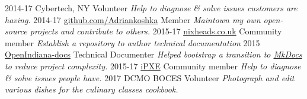 \documentclass[]{friggeri-cv}
\begin{document}
\begin{entrylist}
  \entry
    {2014-17}
    {Cybertech, NY}
    {Volunteer}
    {\emph{Help to diagnose \& solve issues customers are having.}}
  \entry
    {2014-17}
    {\href{https://github.com/AdrianKoshka/}{github.com/Adriankoshka}}
    {Member}
    {\emph{Maintown my own open-source projects and contribute to others.}}
  \entry
    {2015-17}
    {\href{http://nixheads.co.uk}{nixheads.co.uk}}
    {Community member}
    {\emph{Establish a repository to author technical documentation}}
  \entry
    {2015}
    {\href{https://github.com/OpenIndiana/oi-docs}{OpenIndiana-docs}}
    {Technical Documenter}
    {\emph{Helped bootstrap a transition to \href{http://www.mkdocs.org/}{MkDocs} to reduce project complexity.}}
  \entry
    {2015-17}
    {\href{http://ipxe.org}{iPXE}}
    {Community member}
    {\emph{Help to diagnose \& solve issues people have.}}
  \entry
    {2017}
    {DCMO BOCES}
    {Volunteer}
    {\emph{Photograph and edit various dishes for the culinary classes cookbook.}}
\end{entrylist}

%
%
%

% 
\end{document}
